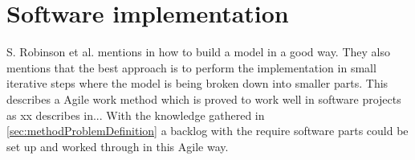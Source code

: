 \section{Software implementation}\label{sec:methodSoftwareImplementation}
S. Robinson et al. mentions in \cite{SecretsSuccessfulSimulation1995} how to build a model in a good way.
They also mentions that the best approach is to perform the implementation in small iterative steps where the model is being broken down into smaller parts.
This describes a Agile work method which is proved to work well in software projects as xx describes in...
With the knowledge gathered in \cref{sec:methodProblemDefinition} a backlog with the require software parts could be set up and worked through in this Agile way.
